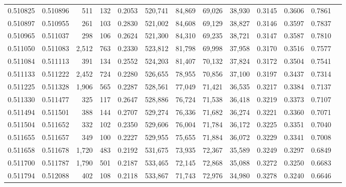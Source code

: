 \begin{tabular}{rrrrrrrrrrrrr}
0.510825 & 0.510896 &   511 &   132 &                                     0.2053 & 520,741 &  84,869 &  69,026 &  38,930 & 0.3145 & 0.3606 & 0.7861 \\
0.510897 & 0.510955 &   261 &   103 &                                     0.2830 & 521,002 &  84,608 &  69,129 &  38,827 & 0.3146 & 0.3597 & 0.7837 \\
0.510965 & 0.511037 &   298 &   106 &                                     0.2624 & 521,300 &  84,310 &  69,235 &  38,721 & 0.3147 & 0.3587 & 0.7810 \\
0.511050 & 0.511083 & 2,512 &   763 &                                     0.2330 & 523,812 &  81,798 &  69,998 &  37,958 & 0.3170 & 0.3516 & 0.7577 \\
0.511084 & 0.511113 &   391 &   134 &                                     0.2552 & 524,203 &  81,407 &  70,132 &  37,824 & 0.3172 & 0.3504 & 0.7541 \\
0.511133 & 0.511222 & 2,452 &   724 &                                     0.2280 & 526,655 &  78,955 &  70,856 &  37,100 & 0.3197 & 0.3437 & 0.7314 \\
0.511225 & 0.511328 & 1,906 &   565 &                                     0.2287 & 528,561 &  77,049 &  71,421 &  36,535 & 0.3217 & 0.3384 & 0.7137 \\
0.511330 & 0.511477 &   325 &   117 &                                     0.2647 & 528,886 &  76,724 &  71,538 &  36,418 & 0.3219 & 0.3373 & 0.7107 \\
0.511494 & 0.511501 &   388 &   144 &                                     0.2707 & 529,274 &  76,336 &  71,682 &  36,274 & 0.3221 & 0.3360 & 0.7071 \\
0.511504 & 0.511652 &   332 &   102 &                                     0.2350 & 529,606 &  76,004 &  71,784 &  36,172 & 0.3225 & 0.3351 & 0.7040 \\
0.511655 & 0.511657 &   349 &   100 &                                     0.2227 & 529,955 &  75,655 &  71,884 &  36,072 & 0.3229 & 0.3341 & 0.7008 \\
0.511658 & 0.511678 & 1,720 &   483 &                                     0.2192 & 531,675 &  73,935 &  72,367 &  35,589 & 0.3249 & 0.3297 & 0.6849 \\
0.511700 & 0.511787 & 1,790 &   501 &                                     0.2187 & 533,465 &  72,145 &  72,868 &  35,088 & 0.3272 & 0.3250 & 0.6683 \\
0.511794 & 0.512088 &   402 &   108 &                                     0.2118 & 533,867 &  71,743 &  72,976 &  34,980 & 0.3278 & 0.3240 & 0.6646 \\

\end{tabular}
